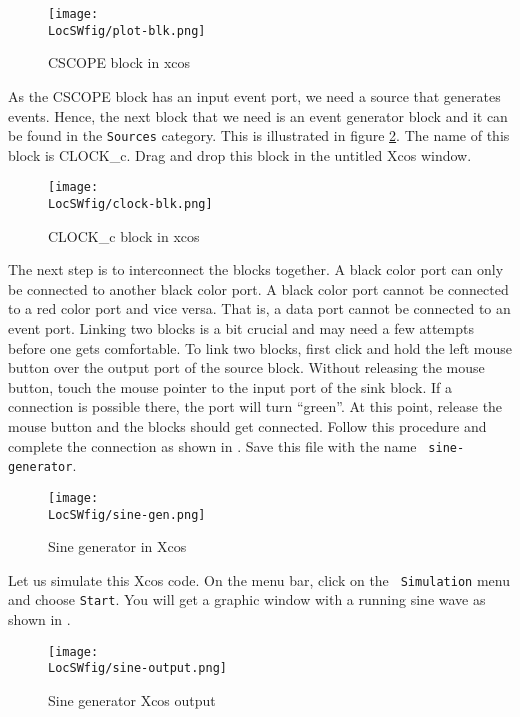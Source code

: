 \begin{figure}
      \centering
      \texttt{[image: \\LocSWfig/plot-blk.png]}
      \caption{CSCOPE block in xcos}
      \label{plot-blk}
\end{figure}

As the CSCOPE block has an
input event port, we need a source that generates events. Hence, the
next block that we need is an event generator block and it can be
found in the {\tt Sources} category. This is illustrated in figure
\ref{clk-blk}. The name of this block is CLOCK\_c. Drag and drop this
block in the untitled Xcos window.

\begin{figure}
      \centering
      \texttt{[image: \\LocSWfig/clock-blk.png]}
      \caption{CLOCK\_c block in xcos}
      \label{clk-blk}
\end{figure}

The next step is to interconnect the blocks together. A black color
port can only be connected to another black color port. A black color
port cannot be connected to a red color port and vice versa.  That is,
a data port cannot be connected to an event port.  Linking
two blocks is a bit crucial and may need a few attempts before one gets
comfortable. To link two blocks, first click and hold the left mouse
button over the output port of the source block. Without releasing the
mouse button, touch the mouse pointer to the input port of the sink
block. If a connection is possible there, the port will turn
``green''. At this point, release the mouse button and the blocks should
get connected. Follow this procedure and complete the connection as
shown in .  Save this file with the name {\tt
            sine-generator}.  

\begin{figure}
      \centering
      \texttt{[image: \\LocSWfig/sine-gen.png]}
      \caption{Sine generator in Xcos}
      \label{sine-gen}
\end{figure}

Let us simulate this Xcos code. On the menu bar, click on the {\tt
            Simulation} menu and choose {\tt Start}. You will get a graphic
window with a running sine wave as shown in .

\begin{figure}
      \centering
      \texttt{[image: \\LocSWfig/sine-output.png]}
      \caption{Sine generator Xcos output}
      \label{sine-output}
\end{figure}

